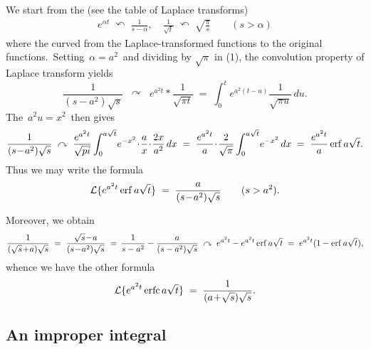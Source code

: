 \documentclass[12pt]{article}
\begin{document}

We start from the  (see the table of Laplace transforms)
\begin{align}
e^{\alpha t} \;\curvearrowleft\; \frac{1}{s\!-\!\alpha}, 
\quad \frac{1}{\sqrt{t}} \;\curvearrowleft\; \sqrt{\frac{\pi}{s}} \qquad (s > \alpha)
\end{align}
where the curved  from the Laplace-transformed functions to the original functions.\, Setting\, $\alpha = a^2$\, and dividing by $\sqrt{\pi}$ in (1), the convolution property of Laplace transform yields
$$\frac{1}{(s\!-\!a^2)\sqrt{s}} \;\;\curvearrowright\;\; 
e^{a^2t}*\frac{1}{\sqrt{\pi t}} \;=\; \int_0^t\!e^{a^2(t-u)}\frac{1}{\sqrt{\pi u}}\,du.$$
The  \,$a^2u = x^2$\, then gives
$$\frac{1}{(s\!-\!a^2)\sqrt{s}} \;\curvearrowright\;
\frac{e^{a^2t}}{\sqrt{pi}}\int_0^{a\sqrt{t}}\!e^{-x^2}\!\cdot\!\frac{a}{x}\!\cdot\!\frac{2x}{a^2}\,dx
\;=\; \frac{e^{a^2t}}{a}\!\cdot\!\frac{2}{\sqrt{\pi}}\int_0^{a\sqrt{t}}\!e^{-x^2}\,dx 
\;=\; \frac{e^{a^2t}}{a}\,{\rm erf}\,a\sqrt{t}.$$
Thus we may write the formula
\begin{align}
\mathcal{L}\{e^{a^2t}\,{\rm erf}\,a\sqrt{t}\} \;=\; \frac{a}{(s\!-\!a^2)\sqrt{s}} \qquad (s > a^2).
\end{align}

Moreover, we obtain
$$\frac{1}{(\sqrt{s}\!+\!a)\sqrt{s}} \;=\; \frac{\sqrt{s}\!-\!a}{(s\!-\!a^2)\sqrt{s}} \;=\, 
\frac{1}{s-a^2}-\frac{a}{(s-a^2)\sqrt{s}} \;\curvearrowright\; 
e^{a^2t}-e^{a^2t}\,{\rm erf}\,a\sqrt{t} \;=\; e^{a^2t}(1-{\rm erf}\,a\sqrt{t}),$$
whence we have the other formula
\begin{align}
\mathcal{L}\{e^{a^2t}\,{\rm erfc}\,a\sqrt{t}\} \;=\; \frac{1}{(a\!+\!\sqrt{s})\sqrt{s}}.
\end{align}

\subsection{An improper integral}
\end{document}
